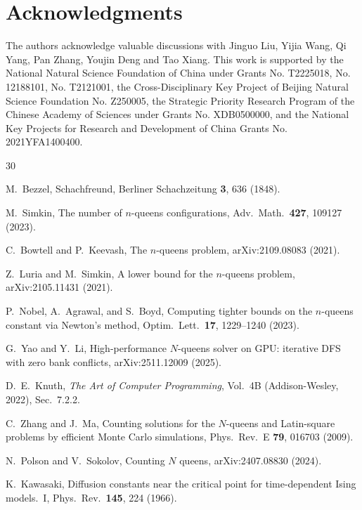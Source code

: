 \documentclass[aps, pre, reprint, amsmath, amssymb, superscriptaddress, floatfix]{revtex4-2}
\begin{document}
\section{Acknowledgments}
The authors acknowledge valuable discussions with Jinguo Liu, Yijia Wang, Qi Yang, Pan Zhang, Youjin Deng and Tao Xiang. This work is supported by the National Natural Science Foundation of China under Grants No. T2225018, No. 12188101, No. T2121001, the Cross-Disciplinary Key Project of Beijing Natural Science Foundation No. Z250005, the Strategic Priority Research Program of the Chinese Academy of Sciences under Grants No. XDB0500000, and the National Key Projects for Research and Development of China Grants No. 2021YFA1400400. 


\begin{thebibliography}{30}

M.~Bezzel,
Schachfreund, Berliner Schachzeitung \textbf{3}, 636 (1848).

M.~Simkin,
The number of $n$-queens configurations,
Adv.\ Math.\ \textbf{427}, 109127 (2023).

C.~Bowtell and P.~Keevash,
The $n$-queens problem,
arXiv:2109.08083 (2021).

Z.~Luria and M.~Simkin,
A lower bound for the $n$-queens problem,
arXiv:2105.11431 (2021).

P.~Nobel, A.~Agrawal, and S.~Boyd,
Computing tighter bounds on the $n$-queens constant via Newton's method,
Optim.\ Lett.\ \textbf{17}, 1229--1240 (2023).

G.~Yao and Y.~Li,
High-performance $N$-queens solver on GPU: iterative DFS with zero
bank conflicts,
arXiv:2511.12009 (2025).

D.~E.~Knuth,
\textit{The Art of Computer Programming}, Vol.~4B
(Addison-Wesley, 2022), Sec.~7.2.2.

C.~Zhang and J.~Ma,
Counting solutions for the $N$-queens and Latin-square problems by
efficient Monte Carlo simulations,
Phys.\ Rev.\ E \textbf{79}, 016703 (2009).

N.~Polson and V.~Sokolov,
Counting $N$ queens,
arXiv:2407.08830 (2024).

K.~Kawasaki,
Diffusion constants near the critical point for time-dependent Ising
models.\ I,
Phys.\ Rev.\ \textbf{145}, 224 (1966).


\end{thebibliography}
\end{document}
